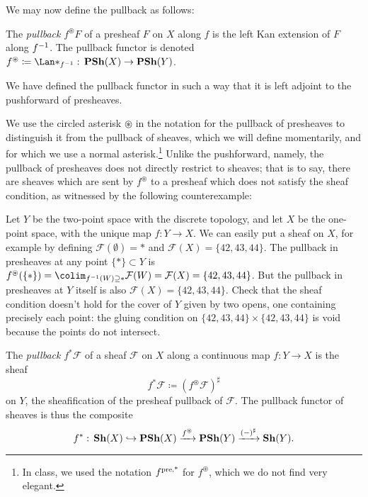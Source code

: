 We may now define the pullback as follows:
\begin{defn}
The \emph{pullback} \(f^{\circledast}F\) of a presheaf \(F\) on \(X\) along \(f\) is the left Kan extension of \(F\) along \(f^{-1}\).
The pullback functor is denoted \(f^{\circledast}\coloneq\Lan*_{f\inv}\colon\catPresheaf(X)\to\catPresheaf(Y)\).
\end{defn}

We have defined the pullback functor in such a way that it is left adjoint to the pushforward of presheaves.

We use the circled asterisk \(\circledast\) in the notation for the pullback of presheaves to distinguish it from the pullback of sheaves, which we will define momentarily, and for which we use a normal asterisk.\footnote{In class, we used the notation $f^{\textup{pre,*}}$ for $f^\circledast$, which we do not find very elegant.}
Unlike the pushforward, namely, the pullback of presheaves does not directly restrict to sheaves; that is to say, there are sheaves which are sent by \(f^{\circledast}\) to a presheaf which does not satisfy the sheaf condition, as witnessed by the following counterexample:

\begin{exmp}
Let $Y$ be the two-point space with the discrete topology, and let $X$ be the one-point space, with the unique map $f: Y \to X$.
We can easily put a sheaf on $X$, for example by defining $\mathcal{F}(\emptyset) = *$ and $\mathcal{F}(X) = \{42, 43, 44\}$.
The pullback in presheaves at any point $\{*\} \subset Y$ is $f^{\circledast}(\{*\}) = \colim_{f^{-1}(W) \supseteq *}\mathcal{F}(W) = \mathcal{F}(X) = \{42, 43, 44\}$. But the pullback in presheaves at $Y$ itself is also $\mathcal{F}(X) = \{42, 43, 44\}$. Check that the sheaf condition doesn't hold for the cover of $Y$ given by two opens, one containing precisely each point: the gluing condition on $\{42,43,44\} \times \{42, 43, 44\}$ is void because the points do not intersect.
\end{exmp}

\begin{defn}
The \emph{pullback} \(f^*\mathcal F\) of a sheaf \(\mathcal F\) on \(X\) along a continuous map \(f\colon Y\to X\) is the sheaf
\[ f^*\mathcal F \coloneq (f^{\circledast}\mathcal F)^\sharp \]
on \(Y\), the sheafification of the presheaf pullback of \(\mathcal F\).
The pullback functor of sheaves is thus the composite
\[ f^* \colon \catSheaf(X) \hookrightarrow \catPresheaf(X) \xrightarrow{f^{\circledast}} \catPresheaf(Y) \xrightarrow{(-)^\sharp} \catSheaf(Y)\text{.} \]
\end{defn}

